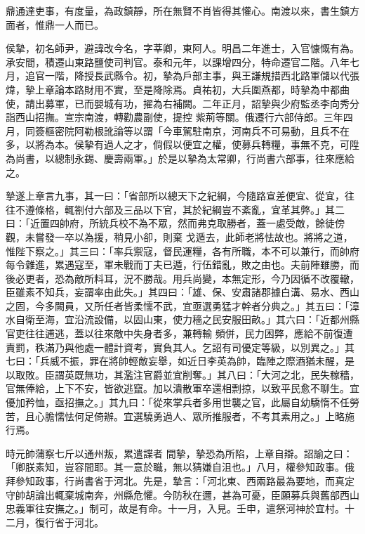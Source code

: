 \begin{pinyinscope}
 鼎通達吏事，有度量，為政鎮靜，所在無賢不肖皆得其懽心。南渡以來，書生鎮方面者，惟鼎一人而已。



 侯摯，初名師尹，避諱改今名，字莘卿，東阿人。明昌二年進士，入官慷慨有為。承安間，積遷山東路鹽使司判官。泰和元年，以課增四分，特命遷官二階。八年七月，追官一階，降授長武縣令。初，摯為戶部主事，與王謙規措西北路軍儲以代張煒，摯上章論本路財用不實，至是降除焉。貞祐初，大兵圍燕都，時摯為中都曲使，請出募軍，已而嬰城有功，擢為右補闕。二年正月，詔摯與少府監丞李向秀分詣西山招撫。宣宗南渡，轉勸農副使，提控
 紫荊等關。俄遷行六部侍郎。三年四月，同簽樞密院阿勒根訛論等以謂「今車駕駐南京，河南兵不可易動，且兵不在多，以將為本。侯摯有過人之才，倘假以便宜之權，使募兵轉糧，事無不克，可陞為尚書，以總制永錫、慶壽兩軍。」於是以摯為太常卿，行尚書六部事，往來應給之。



 摯遂上章言九事，其一曰：「省部所以總天下之紀綱，今隨路宣差便宜、從宜，往往不遵條格，輒劄付六部及三品以下官，其於紀綱豈不紊亂，宜革其弊。」其二曰：「近置四帥府，所統兵校不為不眾，然而弗克取勝者，蓋一處受敵，餘徒傍觀，未嘗發一卒以為援，稍見小卻，則棄
 戈遁去，此師老將怯故也。將將之道，惟陛下察之。」其三曰：「率兵禦寇，督民運糧，各有所職，本不可以兼行，而帥府每令雜進，累遇寇至，軍未戰而丁夫已遁，行伍錯亂，敗之由也。夫前陣雖勝，而後必更者，恐為敵所料耳，況不勝哉。用兵尚變，本無定形，今乃因循不改覆轍，臣雖素不知兵，妄謂率由此失。」其四曰：「雄、保、安肅諸郡據白溝、易水、西山之固，今多闕員，又所任者皆柔懦不武，宜亟選勇猛才幹者分典之。」其五曰：「漳水自衛至海，宜沿流設備，以固山東，使力穡之民安服田畝。」其六曰：「近都州縣官吏往往逋逃，蓋以往來敵中失身者多，兼轉輸
 頻併，民力困弊，應給不前復遭責罰，秩滿乃與他處一體計資考，實負其人。乞詔有司優定等級，以別異之。」其七曰：「兵威不振，罪在將帥輕敵妄舉，如近日李英為帥，臨陣之際酒猶未醒，是以取敗。臣謂英既無功，其濫注官爵並宜削奪。」其八曰：「大河之北，民失稼穡，官無俸給，上下不安，皆欲逃竄。加以潰散軍卒還相剽掠，以致平民愈不聊生。宜優加矜恤，亟招撫之。」其九曰：「從來掌兵者多用世襲之官，此屬自幼驕惰不任勞苦，且心膽懦怯何足倚辦。宜選驍勇過人、眾所推服者，不考其素用之。」上略施行焉。



 時元帥蒲察七斤以通州叛，累遣諜者
 間摯，摯恐為所陷，上章自辯。詔諭之曰：「卿朕素知，豈容間耶。其一意於職，無以猜嫌自沮也。」八月，權參知政事。俄拜參知政事，行尚書省于河北。先是，摯言：「河北東、西兩路最為要地，而真定守帥胡論出輒棄城南奔，州縣危懼。今防秋在邇，甚為可憂，臣願募兵與舊部西山忠義軍往安撫之。」制可，故是有命。十一月，入見。壬申，遣祭河神於宜村。十二月，復行省于河北。




\end{pinyinscope}
